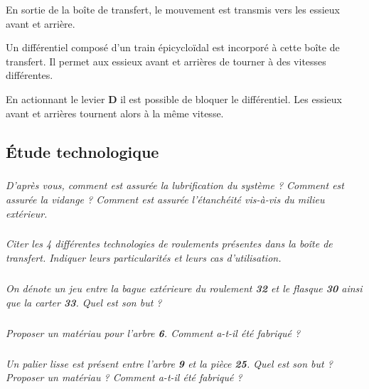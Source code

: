 \documentclass[10pt]{article}
\begin{document}
En sortie de la boîte de transfert, le mouvement est transmis vers les essieux avant et arrière. 

Un différentiel composé d'un train épicycloïdal est incorporé à cette boîte de transfert. Il permet aux essieux avant et arrières de tourner à des vitesses différentes. 

En actionnant le levier \textbf{D} il est possible de bloquer le différentiel. Les essieux avant et arrières tournent alors à la même vitesse. 

\subsection{Étude technologique}


\subparagraph{}
\textit{D'après vous, comment est assurée la lubrification du système ? Comment est assurée la vidange ? Comment est assurée l'étanchéité vis-à-vis du milieu extérieur. }

\subparagraph{}
\textit{Citer les 4 différentes technologies de roulements présentes dans la boîte de transfert. Indiquer leurs particularités et leurs cas d'utilisation.}

\subparagraph{}
\textit{On dénote un jeu entre la bague extérieure du roulement \textbf{32} et le flasque \textbf{30} ainsi que la carter \textbf{33}. Quel est son but ?}

\subparagraph{}
\textit{Proposer un matériau pour l'arbre \textbf{6}. Comment a-t-il été fabriqué ?}
%
%
%
%
%

\subparagraph{}
\textit{Un palier lisse est présent entre l'arbre \textbf{9} et la pièce \textbf{25}. Quel est son but ? Proposer un matériau ? Comment a-t-il été fabriqué ?}
\end{document}
